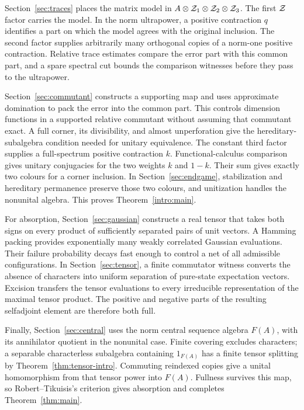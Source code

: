 Section~\ref{sec:traces} places the matrix model in
$A\otimes\mathcal Z_1\otimes\mathcal Z_2\otimes\mathcal Z_3$. The first $\mathcal Z$ factor carries
the model. In the norm ultrapower, a positive contraction $q$ identifies
a part on which the model agrees with the original inclusion. The
second factor supplies arbitrarily many orthogonal copies of a norm-one
positive contraction. Relative trace estimates compare the error part
with this common part, and a spare spectral cut bounds the comparison
witnesses before they pass to the ultrapower.

Section~\ref{sec:commutant} constructs a supporting map and uses
approximate domination to pack the error into the common part. This
controls dimension functions in a supported relative commutant without
assuming that commutant exact. A full corner, its divisibility, and
almost unperforation give the hereditary-subalgebra condition needed
for unitary equivalence.
The constant third factor supplies a full-spectrum positive contraction
$k$. Functional-calculus comparison gives unitary conjugacies for the two
weights $k$ and $1-k$. Their sum gives exactly two colours for a corner
inclusion. In Section~\ref{sec:endgame}, stabilization and hereditary
permanence preserve those two colours, and unitization handles the
nonunital algebra. This proves Theorem~\ref{intro:main}.

For absorption, Section~\ref{sec:gaussian} constructs a real tensor
that takes both signs on every product of sufficiently separated pairs
of unit vectors. A Hamming packing provides exponentially many weakly
correlated Gaussian evaluations. Their failure probability decays fast
enough to control a net of all admissible configurations. In
Section~\ref{sec:tensor}, a finite commutator witness converts the
absence of characters into uniform separation of pure-state expectation
vectors. Excision transfers the tensor evaluations to every irreducible
representation of the maximal tensor product. The positive and negative
parts of the resulting selfadjoint element are therefore both full.

Finally, Section~\ref{sec:central} uses the norm central sequence algebra
$F(A)$, with its annihilator quotient in the nonunital case. Finite
covering excludes characters; a separable characterless subalgebra
containing $1_{F(A)}$ has a finite tensor splitting by
Theorem~\ref{thm:tensor-intro}. Commuting
reindexed copies give a unital homomorphism from that tensor power into
$F(A)$. Fullness survives this map, so Robert--Tikuisis's criterion
gives absorption and completes Theorem~\ref{thm:main}.


